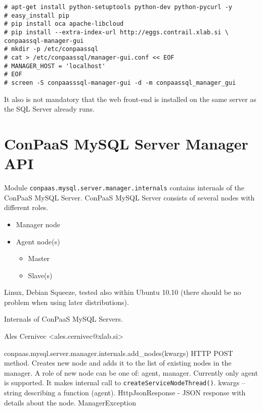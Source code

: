 \documentclass[a4paper,10pt]{article}
\begin{document}
\begin{Verbatim}[frame=single]
# apt-get install python-setuptools python-dev python-pycurl -y
# easy_install pip
# pip install oca apache-libcloud
# pip install --extra-index-url http://eggs.contrail.xlab.si \
conpaassql-manager-gui
# mkdir -p /etc/conpaassql
# cat > /etc/conpaassql/manager-gui.conf << EOF
# MANAGER_HOST = 'localhost'
# EOF
# screen -S conpaasssql-manager-gui -d -m conpaassql_manager_gui
\end{Verbatim}

It also is not mandatory that the web front-end is installed on the same server as the SQL Server already runs. 

\section{ConPaaS MySQL Server Manager API}

Module {\tt conpaas.mysql.server.manager.internals} contains internals of the ConPaaS MySQL Server. ConPaaS MySQL Server consists of several nodes with different roles.

\begin{itemize}
	\item Manager node
	\item Agent node(s)
	\begin{itemize}
		\item Master
		\item Slave(s)
	\end{itemize}	
\end{itemize}

Linux, Debian Squeeze, tested also within Ubuntu 10.10 (there should be no problem when using later distributions).

Internals of ConPaaS MySQL Servers.

Ales Cernivec <ales.cernivec@xlab.si>
      
\vspace{10pt}

\noindent\conapi
{conpaas.mysql.server.manager.internals.add\_nodes(kwargs)}
{HTTP POST method. Creates new node and adds it to the list of existing nodes in the manager. A role of new node can be one of: agent, manager. Currently only agent is supported. It makes internal call to {\tt createServiceNodeThread()}.}
{kwargs -- string describing a function (agent).}
{HttpJsonResponse - JSON response with details about the node.}
{ManagerException}
\end{document}
